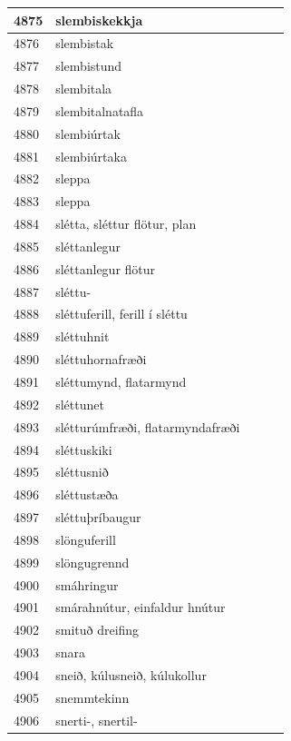 \begin{longtable}{p{}|p{}|p{}|p{}|p{}}
\hline
4875 & slembiskekkja &  &  &  \\
\hline
4876 & slembistak &  &  &  \\
\hline
4877 & slembistund &  &  &  \\
\hline
4878 & slembitala &  &  &  \\
\hline
4879 & slembitalnatafla &  &  &  \\
\hline
4880 & slembiúrtak &  &  &  \\
\hline
4881 & slembiúrtaka &  &  &  \\
\hline
4882 & sleppa &  &  &  \\
\hline
4883 & sleppa &  &  &  \\
\hline
4884 & slétta, sléttur flötur, plan &  &  &  \\
\hline
4885 & sléttanlegur &  &  &  \\
\hline
4886 & sléttanlegur flötur &  &  &  \\
\hline
4887 & sléttu- &  &  &  \\
\hline
4888 & sléttuferill, ferill í sléttu &  &  &  \\
\hline
4889 & sléttuhnit &  &  &  \\
\hline
4890 & sléttuhornafræði &  &  &  \\
\hline
4891 & sléttumynd, flatarmynd &  &  &  \\
\hline
4892 & sléttunet &  &  &  \\
\hline
4893 & slétturúmfræði, flatarmyndafræði &  &  &  \\
\hline
4894 & sléttuskiki &  &  &  \\
\hline
4895 & sléttusnið &  &  &  \\
\hline
4896 & sléttustæða &  &  &  \\
\hline
4897 & sléttuþríbaugur &  &  &  \\
\hline
4898 & slönguferill &  &  &  \\
\hline
4899 & slöngugrennd &  &  &  \\
\hline
4900 & smáhringur &  &  &  \\
\hline
4901 & smárahnútur, einfaldur hnútur &  &  &  \\
\hline
4902 & smituð dreifing &  &  &  \\
\hline
4903 & snara &  &  &  \\
\hline
4904 & sneið, kúlusneið, kúlukollur & &  &  \\
\hline
4905 & snemmtekinn &  &  &  \\
\hline
4906 & snerti-, snertil- &  &  &  \\

\end{longtable}
